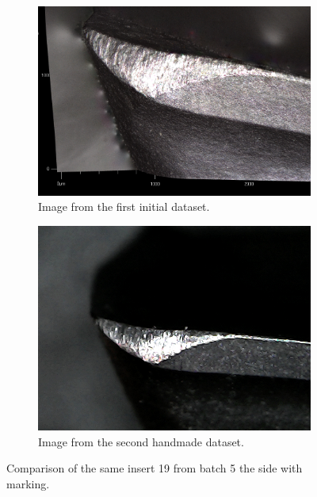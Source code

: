 \begin{figure}[hbtp]
	\begin{subfigure}{0.49\textwidth}
			\includegraphics[width=\linewidth, keepaspectratio=true]{./fig/Vision/Dataset/handmade_datasets/Second_handmade_dataset/t50b-img.PNG}
			\caption{Image from the first initial dataset.}
		\end{subfigure}
		\begin{subfigure}{0.49\textwidth}
			\includegraphics[width=\linewidth, keepaspectratio=true]{./fig/Vision/Dataset/handmade_datasets/Second_handmade_dataset/b_005_p_010_s.jpg}
			\caption{Image from the second handmade dataset.}
		\end{subfigure}
			\caption{Comparison of the same insert 19 from batch 5 the side with marking.}
			 \label{fig:impl:va:do:comparison}
\end{figure}
			
